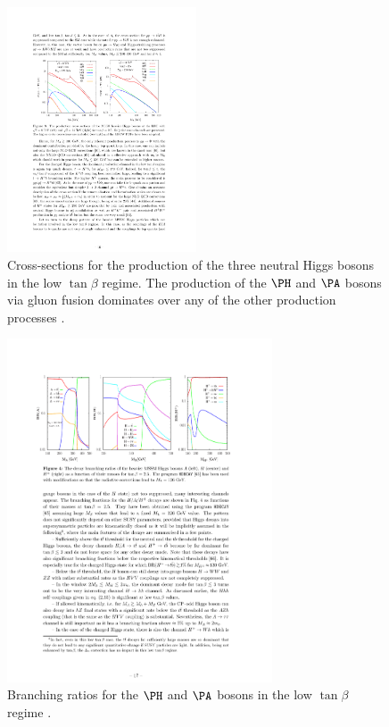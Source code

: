 \begin{figure}[htbp]
   \includegraphics[width=0.5\textwidth]{plots/theory/XS_lowtanb.pdf}
\caption{Cross-sections for the production of the three neutral Higgs bosons in
the low $\tan\beta$ regime. The production of the $\PH$ and $\PA$ bosons
via gluon fusion dominates over any of the other production processes \cite{Djouadi:2013vqa}.}
\label{fig:XSlowtanb}
\end{figure}

\begin{figure}[htbp]
   \includegraphics[width=0.7\textwidth]{plots/theory/BR_lowtanb.pdf}
\caption{Branching ratios for the $\PH$ and $\PA$ bosons in the low $\tan\beta$
regime \cite{Djouadi:2013vqa}.}
\label{fig:BRlowtanb}
\end{figure}

